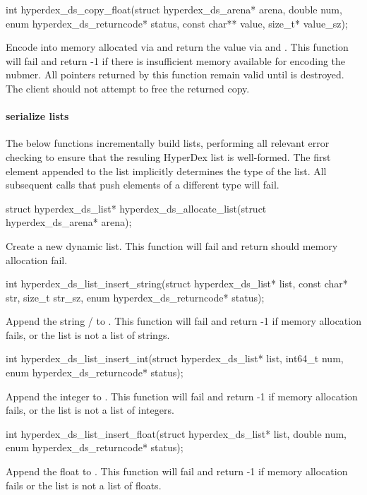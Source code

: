 \begin{ccode}
int hyperdex_ds_copy_float(struct hyperdex_ds_arena* arena, double num,
                           enum hyperdex_ds_returncode* status,
                           const char** value, size_t* value_sz);
\end{ccode}
Encode  into memory allocated via  and return
the value via  and .  This function will fail and
return -1 if there is insufficient memory available for encoding the nubmer.
All pointers returned by this function remain valid until  is
destroyed.  The client should not attempt to free the returned copy.

\paragraph{serialize lists}

The below functions incrementally build lists, performing all relevant error
checking to ensure that the resuling HyperDex list is well-formed.  The first
element appended to the list implicitly determines the type of the list.  All
subsequent calls that push elements of a different type will fail.

\begin{ccode}
struct hyperdex_ds_list* hyperdex_ds_allocate_list(struct hyperdex_ds_arena* arena);
\end{ccode}
Create a new dynamic list.  This function will fail and return
 should memory allocation fail.

\begin{ccode}
int hyperdex_ds_list_insert_string(struct hyperdex_ds_list* list,
                                   const char* str, size_t str_sz,
                                   enum hyperdex_ds_returncode* status);
\end{ccode}
Append the string / to .  This
function will fail and return -1 if memory allocation fails, or the list is not
a list of strings.

\begin{ccode}
int hyperdex_ds_list_insert_int(struct hyperdex_ds_list* list, int64_t num,
                                enum hyperdex_ds_returncode* status);
\end{ccode}
Append the integer  to .  This function will fail
and return -1 if memory allocation fails, or the list is not a list of integers.

\begin{ccode}
int hyperdex_ds_list_insert_float(struct hyperdex_ds_list* list, double num,
                                  enum hyperdex_ds_returncode* status);
\end{ccode}
Append the float  to .  This function will fail
and return -1 if memory allocation fails or the list is not a list of floats.

